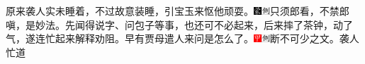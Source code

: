 原来袭人实未睡着，不过故意装睡，引宝玉来怄他顽耍。{\includegraphics[width=3mm]{../Images/00006}\includegraphics[width=3mm]{../Images/00011}\footnotesize \kaishu 只须郎看，不禁郎嗔，是妙法。}先闻得说字、问包子等事，也还可不必起来，后来摔了茶钟，动了气，遂连忙起来解释劝阻。早有贾母遣人来问是怎么了。{\includegraphics[width=3mm]{../Images/00002}\includegraphics[width=3mm]{../Images/00011}\footnotesize \kaishu 断不可少之文。}袭人忙道